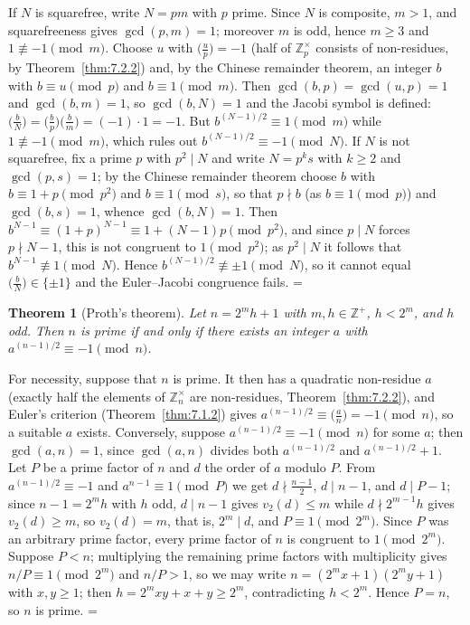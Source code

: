 \documentclass[11pt]{article}
\makeatletter
\let\nt@closedisplay\]
\def\nt@guardedclose{\@ifnextchar\par{\nt@closeafterpar}{\@ifnextchar\end{\postdisplaypenalty\@M\nt@closedisplay}{\nt@closedisplay}}}
\def\nt@closeafterpar\par{\@ifnextchar\par{\nt@closeafterpar}{\@ifnextchar\end{\postdisplaypenalty\@M\nt@closedisplay\par}{\nt@closedisplay\par}}}
\renewenvironment{proof}[1][\proofname]{\par
  \pushQED{\qed}\normalfont\topsep\medskipamount\edef\nt@afterproof{\@endparpenalty=\the\@endparpenalty\relax}\@beginparpenalty\@M\@endparpenalty\@M\let\]\nt@guardedclose\trivlist\item[]\textit{#1\@addpunct{.}} \ignorespaces}{\ifvmode\addpenalty\@M\fi\popQED\nt@afterproof\endtrivlist\@endpefalse}
\theoremstyle{ntstyle}
\newtheorem{theorem}{Theorem}[subsection]
\newcommand{\legs}[2]{\bigl(\tfrac{#1}{#2}\bigr)}
\newcommand{\ZmodUnits}[1]{\mathbb{Z}_{#1}^{\times}}
\makeatother
\begin{document}
\begin{proof} If $N$ is squarefree, write $N=pm$ with $p$
  prime. Since $N$ is composite, $m>1$, and squarefreeness gives $\gcd(p, m)=1$; moreover $m$ is odd, hence $m\ge3$
  and $1\not\equiv-1\pmod{m}$.
  Choose $u$ with $\legs{u}{p}=-1$ (half of $\ZmodUnits{p}$ consists
of non-residues, by Theorem~\ref{thm:7.2.2}) and, by the Chinese remainder theorem, an
  integer $b$ with $b\equiv u\pmod{p}$ and $b\equiv1\pmod{m}$. Then
  $\gcd(b, p)=\gcd(u, p)=1$ and $\gcd(b, m)=1$, so $\gcd(b, N)=1$ and the
  Jacobi symbol is defined:
  $\legs{b}{N}=\legs{b}{p}\legs{b}{m}=(-1)\cdot1=-1$. But
  $b^{(N-1)/2}\equiv1\pmod{m}$ while $1\not\equiv-1\pmod{m}$, which rules
  out $b^{(N-1)/2}\equiv-1\pmod{N}$. If $N$ is not squarefree, fix a prime $p$ with $p^{2}\mid N$ and write
  $N=p^{k}s$ with $k\ge2$ and $\gcd(p, s)=1$; by the Chinese remainder theorem choose $b$ with
  $b\equiv1+p\pmod{p^{2}}$ and $b\equiv1\pmod{s}$, so that $p\nmid b$ (as $b\equiv1\pmod{p}$) and $\gcd(b, s)=1$,
  whence $\gcd(b, N)=1$. Then $b^{N-1}\equiv(1+p)^{N-1}\equiv1+(N-1)p\pmod{p^{2}}$, and since $p\mid N$ forces
  $p\nmid N-1$, this is not congruent to $1\pmod{p^{2}}$; as $p^{2}\mid N$ it follows that
  $b^{N-1}\not\equiv1\pmod{N}$. Hence $b^{(N-1)/2}\not\equiv\pm1\pmod{N}$, so it cannot equal
  $\legs{b}{N}\in\{\pm1\}$ and the Euler--Jacobi congruence fails.
\end{proof}

\begin{theorem}[Proth's theorem]\label{thm:9.1.6}\label{thm:proth-theorem}
  Let $n=2^{m}h+1$
  with $m,h\in\mathbb{Z}^+$, $h<2^{m}$, and $h$ odd. Then $n$ is prime if and only if
  there exists an integer $a$ with $a^{(n-1)/2}\equiv-1\pmod{n}$.

\end{theorem}

\begin{proof} For necessity, suppose that $n$ is prime. It then has
  a quadratic non-residue $a$ (exactly half the elements of $\ZmodUnits{n}$ are non-residues, Theorem~\ref{thm:7.2.2}),
  and Euler's criterion (Theorem~\ref{thm:7.1.2}) gives $a^{(n-1)/2}\equiv\legs{a}{n}=-1\pmod{n}$,
  so a suitable $a$ exists. Conversely, suppose
  $a^{(n-1)/2}\equiv-1\pmod{n}$ for some $a$; then
  $\gcd(a, n)=1$, since $\gcd(a,n)$ divides both $a^{(n-1)/2}$ and $a^{(n-1)/2}+1$. Let $P$ be a prime factor of
  $n$ and $d$ the order of
  $a$ modulo $P$. From $a^{(n-1)/2}\equiv-1$ and $a^{n-1}\equiv1\pmod{P}$ we get $d\nmid\tfrac{n-1}{2}$,
  $d\mid n-1$, and $d\mid P-1$; since
  $n-1=2^{m}h$ with $h$ odd, $d\mid n-1$ gives $v_2(d)\le m$ while
  $d\nmid 2^{m-1}h$ gives $v_2(d)\ge m$, so $v_2(d)=m$, that is, $2^{m}\mid d$, and $P\equiv1\pmod{2^{m}}$.
  Since $P$ was an arbitrary prime factor, every prime factor of $n$ is
  congruent to $1\pmod{2^m}$. Suppose $P<n$; multiplying the remaining prime factors
  with multiplicity gives $n/P\equiv1\pmod{2^m}$ and $n/P>1$, so we may write
  $n=(2^{m}x+1)(2^{m}y+1)$ with $x,y\ge1$; then
  $h=2^{m}xy+x+y\ge2^{m}$, contradicting $h<2^{m}$. Hence $P=n$, so $n$
  is prime.
\end{proof}
\end{document}
